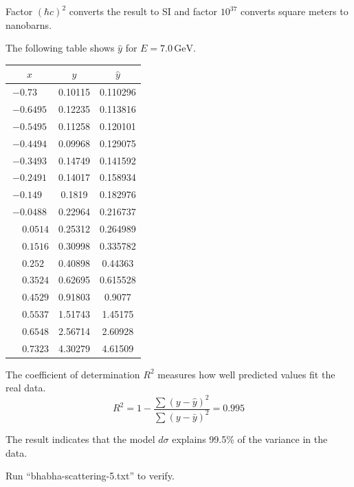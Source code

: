 \documentclass[12pt]{article}
\begin{document}
\noindent
Factor $(\hbar c)^2$ converts the result to SI and factor $10^{37}$ converts square meters to nanobarns.

\bigskip
\noindent
The following table shows $\hat{y}$ for $E=7.0\,\text{GeV}$.

\begin{center}
\begin{tabular}{|c|c|c|}
\hline
$x$ & $y$ & $\hat{y}$\\
\hline
$-0.73\phantom{00}$ & 0.10115 & 0.110296\\
$-0.6495$ & 0.12235 & 0.113816\\
$-0.5495$ & 0.11258 & 0.120101\\
$-0.4494$ & 0.09968 & 0.129075\\
$-0.3493$ & 0.14749 & 0.141592\\
$-0.2491$ & 0.14017 & 0.158934\\
$-0.149\phantom{0}$ & 0.1819\phantom{0} & 0.182976\\
$-0.0488$ & 0.22964 & 0.216737\\
$\phantom{+}0.0514$ & 0.25312 & 0.264989\\
$\phantom{+}0.1516$ & 0.30998 & 0.335782\\
$\phantom{+}0.252\phantom{0}$ & 0.40898 & 0.44363\phantom{0}\\
$\phantom{+}0.3524$ & 0.62695 & 0.615528\\
$\phantom{+}0.4529$ & 0.91803 & 0.9077\phantom{00}\\
$\phantom{+}0.5537$ & 1.51743 & 1.45175\phantom{0}\\
$\phantom{+}0.6548$ & 2.56714 & 2.60928\phantom{0}\\
$\phantom{+}0.7323$ & 4.30279 & 4.61509\phantom{0}\\
\hline
\end{tabular}
\end{center}

\noindent
The coefficient of determination $R^2$ measures how well predicted values fit the real data.
\begin{equation*}
R^2=1-\frac{\sum(y-\hat{y})^2}{\sum(y-\bar{y})^2}=0.995
\end{equation*}

\noindent
The result indicates that the model $d\sigma$ explains 99.5\% of the variance in the data.

\bigskip
\noindent
Run ``bhabha-scattering-5.txt'' to verify.
\end{document}
